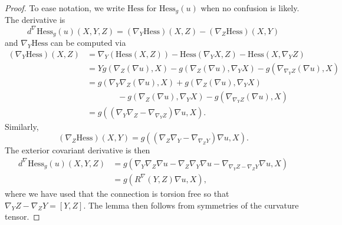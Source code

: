 \documentclass{amsart}
\begin{document}
\begin{proof}
To ease notation, we write $\mathrm{Hess}$ for $\mathrm{Hess}_g(u)$ when no confusion is likely.
The derivative is
\[
d^\nabla\mathrm{Hess}_g(u)(X,Y,Z) = (\nabla_Y\mathrm{Hess})(X,Z) - (\nabla_Z \mathrm{Hess})(X,Y)
\]
and $\nabla_Y\mathrm{Hess}$ can be computed via
\begin{align*}
(\nabla_Y\mathrm{Hess})(X,Z)
&= \nabla_Y(\mathrm{Hess}(X,Z)) - \mathrm{Hess}(\nabla_YX,Z) - \mathrm{Hess}(X,\nabla_YZ) \\
&= Yg(\nabla_Z(\nabla u),X) - g(\nabla_Z(\nabla u ), \nabla_YX) - g(\nabla_{\nabla_YZ}(\nabla u),X) \\
&= g(\nabla_Y \nabla_Z (\nabla u ), X) + g(\nabla_Z(\nabla u), \nabla_YX) \\
&\phantom{=} \hspace{1cm}  - g(\nabla_Z(\nabla u ), \nabla_YX) - g(\nabla_{\nabla_YZ}(\nabla u),X) \\
&= g( (\nabla_Y \nabla_Z  - \nabla_{\nabla_YZ})\nabla u, X).
\end{align*}
Similarly, 
\[
(\nabla_Z \mathrm{Hess})(X,Y) = g( (\nabla_Z \nabla_Y  - \nabla_{\nabla_ZY})\nabla u, X).
\]
The exterior covariant derivative is then 
\begin{align*}
d^\nabla\mathrm{Hess}_g(u)(X,Y,Z)
&= g( \nabla_Y \nabla_Z \nabla u - \nabla_Z \nabla_Y \nabla u - \nabla_{\nabla_YZ - \nabla_ZY} \nabla u , X) \\
&= g( R^\nabla(Y,Z)\nabla u ,X),
\end{align*}
where we have used that the connection is torsion free so that $\nabla_YZ - \nabla_ZY = [Y,Z]$.
The lemma then follows from symmetries of the curvature tensor. 
\end{proof}
\end{document}
